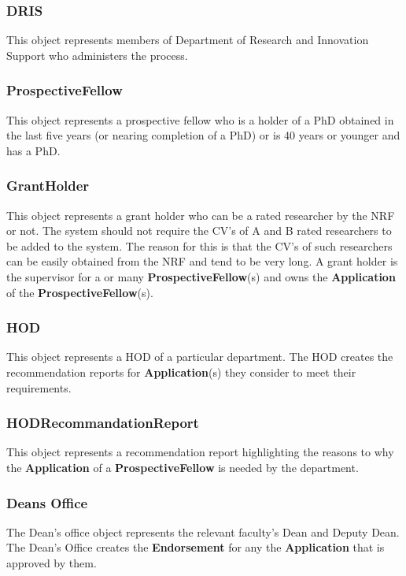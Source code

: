 \documentclass[12pt]{article}
\begin{document}
\subsubsection{DRIS}
This object represents members of Department of Research and Innovation Support who administers the process.

\subsubsection{ProspectiveFellow}
This object represents a prospective fellow who is a holder of a PhD obtained in the last five years (or nearing completion of a PhD) or is 40 years or younger and has a PhD.

\subsubsection{GrantHolder}
This object represents a grant holder who can be a rated researcher by the NRF or not. The system should not require the CV's of A and B rated researchers to be added to the system. The reason for this is that the CV's of such researchers can be easily obtained from the NRF and tend to be very long. A grant holder is the supervisor for a or many \textbf{ProspectiveFellow}(s) and owns the \textbf{Application} of the \textbf{ProspectiveFellow}(s).

\subsubsection{HOD}
This object represents a HOD of a particular department. The HOD creates the recommendation reports for \textbf{Application}(s) they consider to meet their requirements.\\

\subsubsection{HODRecommandationReport}
This object represents a recommendation report highlighting the reasons to why the \textbf{Application} of a \textbf{ProspectiveFellow} is needed by the department.

\subsubsection{Deans Office}
The Dean's office object represents the relevant faculty's Dean and Deputy Dean. The Dean's Office creates the \textbf{Endorsement} for any the \textbf{Application} that is approved by them.
\end{document}

